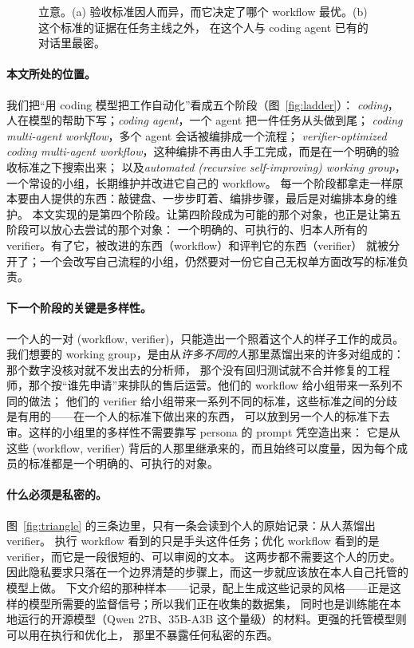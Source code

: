 \documentclass[10pt,UTF8,scheme=plain]{ctexart}
\begin{document}
\begin{figure}[t]
\centering

\caption{立意。(a) 验收标准因人而异，而它决定了哪个 workflow 最优。(b) 这个标准的证据在任务主线之外，
在这个人与 coding agent 已有的对话里最密。}
\label{fig:idea}
\end{figure}

\paragraph{本文所处的位置。} 我们把“用 coding 模型把工作自动化”看成五个阶段（图~\ref{fig:ladder}）：
\emph{coding}，人在模型的帮助下写；\emph{coding agent}，一个 agent 把一件任务从头做到尾；
\emph{coding multi-agent workflow}，多个 agent 会话被编排成一个流程；
\emph{verifier-optimized coding multi-agent workflow}，这种编排不再由人手工完成，而是在一个明确的验收标准之下搜索出来；
以及\emph{automated (recursive self-improving) working group}，一个常设的小组，长期维护并改进它自己的 workflow。
每一个阶段都拿走一样原本要由人提供的东西：敲键盘、一步步盯着、编排步骤，最后是对编排本身的维护。
本文实现的是第四个阶段。让第四阶段成为可能的那个对象，也正是让第五阶段可以放心去尝试的那个对象：
一个明确的、可执行的、归本人所有的 verifier。有了它，被改进的东西（workflow）和评判它的东西（verifier）
就被分开了；一个会改写自己流程的小组，仍然要对一份它自己无权单方面改写的标准负责。

\paragraph{下一个阶段的关键是多样性。} 一个人的一对 (workflow, verifier)，只能造出一个照着这个人的样子工作的成员。
我们想要的 working group，是由从\emph{许多不同的人}那里蒸馏出来的许多对组成的：那个数字没核对就不发出去的分析师，
那个没有回归测试就不合并修复的工程师，那个按“谁先申请”来排队的售后运营。他们的 workflow 给小组带来一系列不同的做法；
他们的 verifier 给小组带来一系列不同的标准，这些标准之间的分歧是有用的——在一个人的标准下做出来的东西，
可以放到另一个人的标准下去审。这样的小组里的多样性不需要靠写 persona 的 prompt 凭空造出来：
它是从这些 (workflow, verifier) 背后的人那里继承来的，而且始终可以度量，因为每个成员的标准都是一个明确的、可执行的对象。

\paragraph{什么必须是私密的。} 图~\ref{fig:triangle} 的三条边里，只有一条会读到个人的原始记录：从人蒸馏出 verifier。
执行 workflow 看到的只是手头这件任务；优化 workflow 看到的是 verifier，而它是一段很短的、可以审阅的文本。
这两步都不需要这个人的历史。因此隐私要求只落在一个边界清楚的步骤上，而这一步就应该放在本人自己托管的模型上做。
下文介绍的那种样本——记录，配上生成这些记录的风格——正是这样的模型所需要的监督信号；所以我们正在收集的数据集，
同时也是训练能在本地运行的开源模型（Qwen 27B、35B-A3B 这个量级）的材料。更强的托管模型则可以用在执行和优化上，
那里不暴露任何私密的东西。
\end{document}
